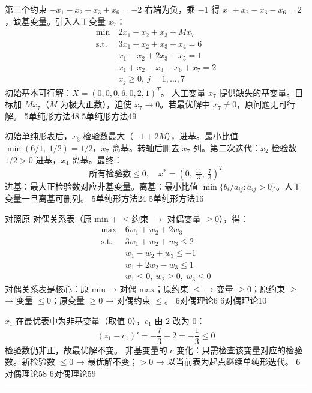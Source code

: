   {第三个约束 $-x_1-x_2+x_3+x_6=-2$ 右端为负，乘 $-1$ 得 $x_1+x_2-x_3-x_6=2$，缺基变量。引入人工变量 $x_7$：
  \begin{align*}
    \min\ & 2x_1 - x_2 + x_3 + Mx_7 \\
    \text{s.t.}\ & 3x_1 + x_2 + x_3 + x_4 = 6 \\
    & x_1 - x_2 + 2x_3 - x_5 = 1 \\
    & x_1 + x_2 - x_3 - x_6 + x_7 = 2 \\
    & x_j \ge 0,\ j=1,\dots,7
  \end{align*}
  初始基本可行解：$X = (0,0,0,6,0,2,1)^T$。}
  {人工变量 $x_7$ 提供缺失的基变量。目标加 $Mx_7$（$M$ 为极大正数），迫使 $x_7\to 0$。若最优解中 $x_7\neq 0$，原问题无可行解。}
  {5单纯形方法}{48}
  {5单纯形方法}{49}

  {初始单纯形表后，$x_3$ 检验数最大（$-1+2M$），进基。最小比值 $\min(6/1,\ 1/2)=1/2$，$x_7$ 离基。转轴后删去 $x_7$ 列。第二次迭代：$x_2$ 检验数 $1/2>0$ 进基，$x_4$ 离基。最终：
  \[
  \text{所有检验数}\le 0,\quad x^* = (0,\ \tfrac{11}{3},\ \tfrac{7}{3})^T
  \]}
  {进基：最大正检验数对应非基变量。离基：最小比值 $\min\{b_i/a_{ij}: a_{ij}>0\}$。人工变量一旦离基可删列。}
  {5单纯形方法}{24}
  {5单纯形方法}{16}

  {对照原-对偶关系表（原 min + $\le$约束 $\to$ 对偶变量 $\ge 0$），得：
  \begin{align*}
    \max\ & 6w_1 + w_2 + 2w_3 \\
    \text{s.t.}\ & 3w_1 + w_2 + w_3 \le 2 \\
    & w_1 - w_2 + w_3 \le -1 \\
    & w_1 + 2w_2 - w_3 \le 1 \\
    & w_1 \le 0,\ w_2 \ge 0,\ w_3 \le 0
  \end{align*}}
  {对偶关系表是核心：原 min → 对偶 max；原约束 $\le$ → 变量 $\ge 0$；原约束 $\ge$ → 变量 $\le 0$；原变量 $\ge 0$ → 对偶约束 $\le$。}
  {6对偶理论}{6}
  {6对偶理论}{10}

  {$x_1$ 在最优表中为非基变量（取值 $0$），$c_1$ 由 $2$ 改为 $0$：
  \[
  (z_1-c_1)' = -\frac{7}{3} + 2 = -\frac{1}{3} \le 0
  \]
  检验数仍非正，故最优解不变。}
  {非基变量的 $c$ 变化：只需检查该变量对应的检验数。新检验数 $\le 0$ → 最优解不变；$>0$ → 以当前表为起点继续单纯形迭代。}
  {6对偶理论}{58}
  {6对偶理论}{59}

\rule{\textwidth}{0.4pt}


